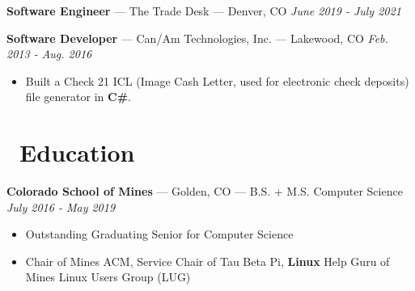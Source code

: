 \documentclass[10pt,letterpaper]{article}
\begin{document}
\vspace{3pt}
{\fontsize{11}{0}
\textbf{Software Engineer} --- The Trade Desk --- Denver, CO}
\hfill \textit{June 2019 - July 2021}




\vspace{3pt}
{\fontsize{11}{0}
\textbf{Software Developer} --- Can/Am Technologies, Inc. --- Lakewood, CO}
\hfill \textit{Feb. 2013 - Aug. 2016}
\begin{itemize}
    \item Built a Check 21 ICL (Image Cash Letter, used for electronic check
        deposits) file generator in \textbf{C\#}.
\end{itemize}


\section*{\faBook\ Education}
{\fontsize{11}{0}
\textbf{Colorado School of Mines} --- Golden, CO --- B.S. + M.S. Computer Science}
\hfill \textit{July 2016 - May 2019}
\begin{itemize}
    \item Outstanding Graduating Senior for Computer Science
    \item Chair of Mines ACM, Service Chair of Tau Beta Pi, \textbf{Linux} Help
        Guru of Mines Linux Users Group (LUG)
\end{itemize}
\end{document}
